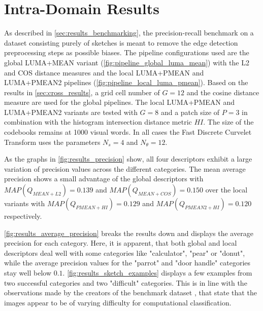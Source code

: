 \section{Intra-Domain Results}\label{sec:intra_results}

As described in \autoref{sec:results_benchmarking}, the precision-recall
benchmark on a dataset consisting purely of sketches is meant to remove the
edge detection preprocessing steps as possible biases. The pipeline
configurations used are the global LUMA+MEAN variant
(\autoref{fig:pipeline_global_luma_mean}) with the L2 and COS distance measures
and the local LUMA+PMEAN and LUMA+PMEAN2 pipelines
(\autoref{fig:pipeline_local_luma_pmean}). Based on the results in
\autoref{sec:cross_results}, a grid cell number of $G=12$ and the cosine
distance measure are used for the global pipelines. The local LUMA+PMEAN and
LUMA+PMEAN2 variants are tested with $G=8$ and a patch size of $P=3$ in
combination with the histogram intersection distance metric $HI$. The size of
the codebooks remains at 1000 visual words. In all cases the Fast Discrete
Curvelet Transform uses the parameters $N_s=4$ and $N_{\theta}=12$.

As the graphs in \autoref{fig:results_precision} show, all four descriptors
exhibit a large variation of precision values across the different categories.
The mean average precision shows a small advantage of the global descriptors
with $MAP(Q_{MEAN+L2})=0.139$ and $MAP(Q_{MEAN+COS})=0.150$ over the local
variants with $MAP(Q_{PMEAN+HI})=0.129$ and $MAP(Q_{PMEAN2+HI})=0.120$
respectively.

\autoref{fig:results_average_precision} breaks the results down and displays
the average precision for each category. Here, it is apparent, that both global
and local descriptors deal well with some categories like "calculator", "pear"
or "donut", while the average precision values for the "parrot" and "door
handle" categories stay well below $0.1$. \autoref{fig:results_sketch_examples}
displays a few examples from two successful categories and two "difficult"
categories. This is in line with the observations made by the creators of the
benchmark dataset \autocite{eitz_how_2012}, that state that the images appear
to be of varying difficulty for computational classification. 

